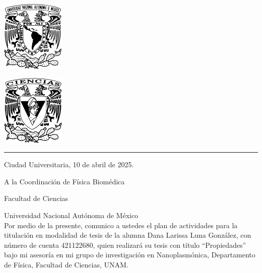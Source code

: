 \documentclass[9pt,letterpaper]{article}
\begin{document}
	
	
	\begin{center}
		\begin{minipage}{3cm}
			\begin{center}
				\includegraphics[height=3.4cm]{Logo_UNAM (1)}
			\end{center}
		\end{minipage}\hfill
		\begin{minipage}{3cm}
			\begin{center}
				\includegraphics[height=3.4cm]{Logo_FC (1)}
			\end{center}
		\end{minipage}
	\end{center}
	
	\rule{17cm}{0.1mm}
	
	\hspace{0cm}
	
	\parbox{\textwidth}{\raggedleft Ciudad Universitaria, 10 de abril de 2025.}
	
	\hspace{1cm}
	
	\vspace{0.5cm}
	
	A la Coordinación de Física Biomédica
	
	Facultad de Ciencias
	
	Universidad Nacional Autónoma de México\\
	
	Por medio de la presente, comunico a ustedes el plan de actividades para la titulación en modalidad de tesis de la alumna Dana Larissa Luna González, con número de cuenta 421122680, quien realizará su tesis con título ``Propiedades'' bajo mi asesoría en mi grupo de investigación en Nanoplasmónica, Departamento de Física, Facultad de Ciencias, UNAM.\\
	
\end{document}
